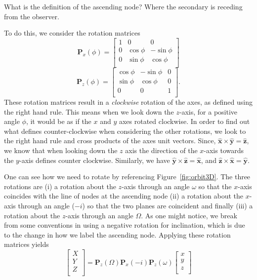 \documentclass[modern]{aastex62}
\begin{document}
What is the definition of the ascending node? Where the secondary is receding from the observer.

To do this, we consider the rotation matrices
\begin{equation}
  \boldsymbol{P}_x(\phi) = \left [
  \begin{array}{ccc}
    1 & 0 & 0 \\
    0 & \cos \phi & - \sin \phi \\
    0 & \sin \phi & \cos \phi \\
    \end{array}\right]
\end{equation}
\begin{equation}
  \boldsymbol{P}_z (\phi) = \left [
  \begin{array}{ccc}
    \cos \phi & - \sin \phi & 0\\
    \sin \phi & \cos \phi & 0 \\
    0 & 0 & 1 \\
    \end{array}\right].
\end{equation}
These rotation matrices result in a \emph{clockwise} rotation of the axes, as defined using the right hand rule. This means when we look down the $z$-axis, for a positive angle $\phi$, it would be as if the $x$ and $y$ axes rotated clockwise.
In order to find out what defines counter-clockwise when considering the other rotations, we look to the right hand rule and cross products of the axes unit vectors. Since, $\hat{\bm x} \times \hat{\bm y} = \hat{\bm z}$, we know that when looking down the $z$ axis the direction of the $x$-axis towards the $y$-axis defines counter clockwise.
Similarly, we have $\hat{{\bm y}} \times \hat{{\bm z}} = \hat{{\bm x}}$, and $\hat{{\bm z}} \times \hat{{\bm x}} = \hat{{\bm y}}$.

One can see how we need to rotate by referencing Figure~\ref{fig:orbit3D}. The three rotations are (i) a rotation about the $z$-axis through an angle $\omega$ so that the $x$-axis coincides with the line of nodes at the ascending node (ii) a rotation about the $x$-axis through an angle ($-i$) so that the two planes are coincident and finally (iii) a rotation about the $z$-axis through an angle $\Omega$. As one might notice, we break from some conventions \citep[e.g.,][]{Murray:2010} in using a negative rotation for inclination, which is due to the change in how we label the ascending node. Applying these rotation matrices yields
\begin{equation}
  \left [ \begin{array}{c}
  X \\
  Y \\
  Z \\
\end{array}
  \right ] =
  \boldsymbol{P}_z (\Omega) \boldsymbol{P}_x(-i) \boldsymbol{P}_z(\omega)
  \left [
  \begin{array}{c}
  x \\
  y \\
  z \\
  \end{array}
  \right]
\end{equation}
\end{document}

